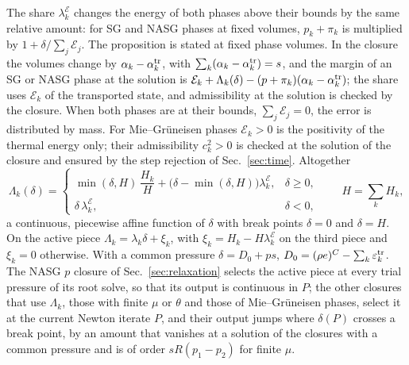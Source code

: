 \documentclass[a4paper,fleqn]{cas-sc}
\begin{document}
The share $\lambda^{\mathcal E}_k$ changes the energy of both phases above their bounds by the same relative amount: for SG and NASG phases at
fixed volumes, $p_k+\pi_k$ is multiplied by $1+\delta/\sum_j\mathcal E_j$.
The proposition is stated at fixed phase volumes. In the closure the volumes change by $\alpha_k-\alpha^{\rm tr}_k$, with
$\sum_k(\alpha_k-\alpha^{\rm tr}_k)=s$, and the margin of an SG or NASG phase at the solution is
$\mathcal E_k+\Lambda_k(\delta)-(p+\pi_k)(\alpha_k-\alpha^{\rm tr}_k)$; the share uses $\mathcal E_k$ of the transported state, and
admissibility at the solution is checked by the closure. When both
phases are at their bounds, $\sum_j\mathcal E_j=0$, the error is distributed by mass. For Mie--Gr\"uneisen phases
$\mathcal E_k>0$ is the positivity of the thermal energy only; their admissibility $c_k^2>0$ is checked at the solution of the
closure and ensured by the step rejection of Sec.~\ref{sec:time}. Altogether
\begin{equation}
\Lambda_k(\delta)=\begin{cases}\min(\delta,H)\,\dfrac{H_k}{H}+\big(\delta-\min(\delta,H)\big)\lambda^{\mathcal E}_k,&\delta\ge0,\\[4pt]
\delta\,\lambda^{\mathcal E}_k,&\delta<0,\end{cases}\qquad H=\sum_kH_k ,
\label{eq:Lambda}
\end{equation}
a continuous, piecewise affine function of $\delta$ with break points $\delta=0$ and $\delta=H$. On the active piece
$\Lambda_k=\lambda_k\delta+\xi_k$, with $\xi_k=H_k-H\lambda^{\mathcal E}_k$ on the third piece and $\xi_k=0$ otherwise. With a common pressure
$\delta=D_0+ps$, $D_0=(\rho e)^C-\sum_k\varepsilon^{\rm tr}_k$. The NASG $p$ closure of Sec.~\ref{sec:relaxation} selects the active piece at every trial pressure of its
root solve, so that its output is continuous in $P$; the other closures that use $\Lambda_k$, those
with finite $\mu$ or $\theta$ and those of Mie--Gr\"uneisen phases, select it at the current Newton iterate $P$, and their output
jumps where $\delta(P)$ crosses a break point, by an amount that vanishes at a solution of the closures with a common pressure
and is of order $sR(p_1-p_2)$ for finite $\mu$.
\end{document}

